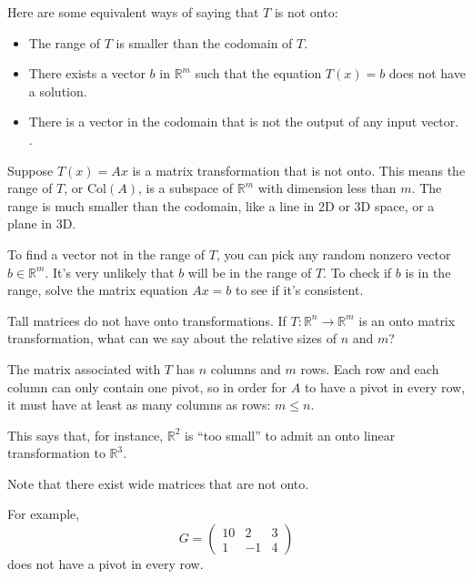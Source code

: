 \documentclass[a4paper,12pt]{article}
\begin{document}
Here are some equivalent ways of saying that $T$ is not onto:
\begin{itemize}
    \item The range of $T$ is smaller than the codomain of $T$.
    \item There exists a vector $b$ in \(\mathbb{R}^m\) such that the equation $T(x) = b$ does not have a solution.
    \item There is a vector in the codomain that is not the output of any input vector.
.
\end{itemize}
Suppose \( T(x) = Ax \) is a matrix transformation that is not onto. This means the range of \( T \), or \( \text{Col}(A) \), is a subspace of \( \mathbb{R}^m \) with dimension less than \( m \). The range is much smaller than the codomain, like a line in 2D or 3D space, or a plane in 3D. 

To find a vector not in the range of \( T \), you can pick any random nonzero vector \( b \in \mathbb{R}^m \). It's very unlikely that \( b \) will be in the range of \( T \). To check if \( b \) is in the range, solve the matrix equation \( Ax = b \) to see if it's consistent.


\begin{tcolorbox}[title=Attention!,colframe=blue!70!black, colback=blue!5!white]
Tall matrices do not have onto transformations. If \( T : \mathbb{R}^n \to \mathbb{R}^m \) is an onto matrix transformation, what can we say about the relative sizes of \( n \) and \( m \)?

The matrix associated with \( T \) has \( n \) columns and \( m \) rows. Each row and each column can only contain one pivot, so in order for \( A \) to have a pivot in every row, it must have at least as many columns as rows: \( m \leq n \).

This says that, for instance, \( \mathbb{R}^2 \) is “too small” to admit an onto linear transformation to \( \mathbb{R}^3 \).

Note that there exist wide matrices that are not onto.
\end{tcolorbox}
For example, 
\[
G = \begin{pmatrix} 
10 & 2 & 3 \\
1 & -1 & 4
\end{pmatrix}
\]
does not have a pivot in every row.
\end{document}
